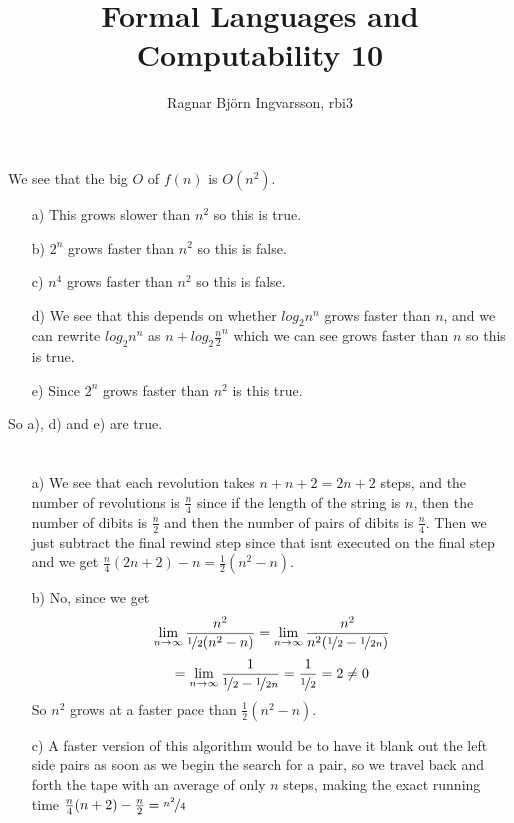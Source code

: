 \documentclass{article}
\title{Formal Languages and Computability 10}
\author{Ragnar Björn Ingvarsson, rbi3}
\begin{document}
\renewcommand\thepage{}

	\maketitle

	\newpage
	\setcounter{page}{1}
	\renewcommand\thepage{\arabic{page}}

	\section{}
	We see that the big $O$ of $f(n)$ is $O(n^2)$.
	\begin{itemize}
		\item[a)] This grows slower than $n^2$ so this is true.
		\item[b)] $2^n$ grows faster than $n^2$ so this is false.
		\item[c)] $n^4$ grows faster than $n^2$ so this is false.
		\item[d)] We see that this depends on whether $log_2n^n$ grows 
			faster than $n$, and we can rewrite $log_2n^n$ as 
			$n + log_2\frac{n}{2}^n$ which we can see grows faster than $n$ 
			so this is true.
		\item[e)] Since $2^n$ grows faster than $n^2$ is this true.
	\end{itemize}
	So a), d) and e) are true.

	\section{}
	\begin{itemize}
		\item[a)] We see that each revolution takes $n + n + 2 = 2n + 2$ 
			steps, and the number of revolutions is $\frac{n}{4}$ since 
			if the length of the string is $n$, then the number of dibits 
			is $\frac{n}{2}$ and then the number of pairs of dibits is 
			$\frac{n}{4}$. Then we just subtract the final rewind step 
			since that isnt executed on the final step and we get 
			$\frac{n}{4}(2n+2) - n = \frac{1}{2}(n^2 - n)$.
		\item[b)] No, since we get
			\[
				\lim_{n\to\infty} \frac{n^2}{\nicefrac{1}{2}(n^2 - n)} = 
				\lim_{n\to\infty} \frac{n^2}{n^2(\nicefrac{1}{2} - \nicefrac{1}{2n})} 
			\]
			\[
				= \lim_{n\to\infty} \frac{1}{\nicefrac{1}{2} - \nicefrac{1}{2n}}
				= \frac{1}{\nicefrac{1}{2}} = 2 \neq 0
			\]
			So $n^2$ grows at a faster pace than $\frac{1}{2}(n^2 - n)$.
		\item[c)] A faster version of this algorithm would be to have
			it blank out the left side pairs as soon as we begin the search 
			for a pair, so we travel back and forth the tape with an average 
			of only $n$ steps, making the exact running time 
			$\frac{n}{4}(n + 2) - \frac{n}{2} = \nicefrac{n^2}{4}$
	\end{itemize}
\end{document}
